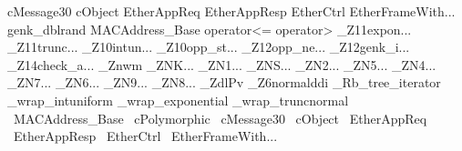 cMessage30
cObject
EtherAppReq
EtherAppResp
EtherCtrl
EtherFrameWith...
genk_dblrand
MACAddress_Base
operator<=
operator>
_Z11expon...
_Z11trunc...
_Z10intun...
_Z10opp_st...
_Z12opp_ne...
_Z12genk_i...
_Z14check_a...
_Znwm
_ZNK...
_ZN1...
_ZNS...
_ZN2...
_ZN5...
_ZN4...
_ZN7...
_ZN6...
_ZN9...
_ZN8...
_ZdlPv
_Z6normalddi
_Rb_tree_iterator
_wrap_intuniform
_wrap_exponential
_wrap_truncnormal
~MACAddress_Base
~cPolymorphic
~cMessage30
~cObject
~EtherAppReq
~EtherAppResp
~EtherCtrl
~EtherFrameWith...

